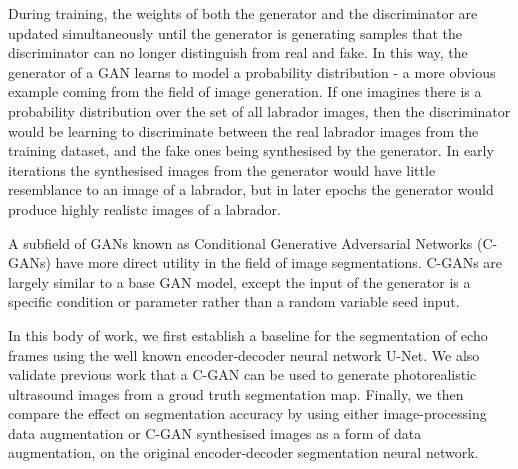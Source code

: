 During training, the weights of both the generator and the discriminator are
updated simultaneously until the generator is generating samples that the
discriminator can no longer distinguish from real and fake. In this way, the
generator of a GAN learns to model a probability distribution - a more obvious
example coming from the field of image generation. If one imagines
there is a probability distribution over the set of all labrador images, then the
discriminator would be learning to discriminate between the real labrador images
from the training dataset, and the fake ones being synthesised by the generator.
In early iterations the synthesised images from the generator would have little
resemblance to an image of a labrador, but in later epochs the generator would
produce highly realistc images of a labrador. \newline

A subfield of GANs known as Conditional Generative Adversarial Networks (C-GANs)
have more direct utility in the field of image segmentations. C-GANs are largely
similar to a base GAN model, except the input of the generator is a specific
condition or parameter rather than a random variable seed input. \newline

In this body of work, we first establish a baseline for the segmentation of echo
frames using the well known encoder-decoder neural network U-Net. We also
validate previous work that a C-GAN can be used to generate photorealistic
ultrasound images from a groud truth segmentation map. Finally, we then compare
the effect on segmentation accuracy by using either image-processing data augmentation
or C-GAN synthesised images as a form of data augmentation, on the original
encoder-decoder segmentation neural network.